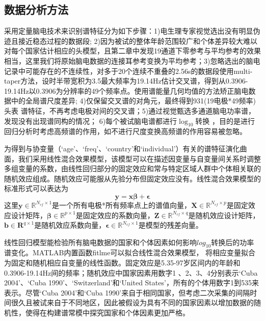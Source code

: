 \subsection{数据分析方法}\label{6ch:lme}
采用定量脑电技术来识别谱特征分为如下步骤：1)电生理专家视觉选出没有明显伪迹且接近稳态过程的数据段; 2)因为被试的整体年龄范围较广和个体差异较大难以对每个国家估计相应的头模型，且第二章中发现19通道下零参考与平均参考的效果相当，这里我们将原始脑电数据的连接耳参考变换为平均参考；3)忽略选出的脑电记录中可能存在的不连续性，对多于20个连续不重叠的2.56s的数据段使用multi-taper方法，设时半带宽积为3.5最大频率为19.14Hz估计交叉谱，得到从0.3906-19.14Hz以0.3906为分辨率的49个频率点。使用谱能量几何均值的方法矫正脑电数据中的全局谱尺度差异; 4)仅保留交叉谱的对角元，最终得到931(19电极*49频率)头表
谱特征，不再考虑电极对间的交叉谱；5)通过视觉甄选多通道脑电功率谱，发现没有出现谱同构的情况； 6)每个被试脑电谱都进行$\log_{10}$转换
，目的是进行回归分析时考虑高频谱的作用，如不进行尺度变换高频谱的作用容易被忽略。

为得到与协变量（‘age’、‘freq’、‘country’和‘individual’）有关的谱特征演化曲面，我们采用线性混合效果模型，该模型可以在描述因变量与自变量间关系时调整多组变量的系数，由线性回归部分的固定效应和常与特定区域人群中个体相关联的随机效应组成。随机效应可能服从先验分布但固定效应没有。线性混合效果模型的标准形式可以表达为
\begin{equation*}
\mathbf{y=x\beta+\epsilon}
\end{equation*}
这里$\mathbf{y}\in{\mathbb{R}^{N_{cf}\times{1}}}$是一个所有电极*所有频率点上的谱值向量，$\mathbf{X}\in{\mathbb{R}^{N_{cf}\times{p}}}$是固定效应设计矩阵，$\mathbf{\beta}\in{\mathbb{R}^{p\times{1}}}$是固定效应的系数向量，$\mathbf{Z}\in{\mathbb{R}^{N_{cf}\times{q}}}$是随机效应设计矩阵，$\mathbf{b}\in{\mathbf{R}^{q\times{1}}}$是随机效应系数向量，$\mathbf{\epsilon}\in{\mathbb{R}^{N_{cf}\times{1}}}$是模型的残差向量。

线性回归模型能检验所有脑电数据的国家和个体因素如何影响$log_{10}$转换后的功率谱变化。MATLAB内置函数fitlme可以拟合线性混合效果模型，
将相应变量拟合为固定和随机相应自变量的线性函数。固定效应是5.35-97岁区间内的年龄和0.3906-19.14Hz间的频率；随机效应中国家因素用数字1
、2、3、4分别表示‘Cuba 2004’、‘Cuba 1990’、‘Switzerland’和‘United States’，所有的个体用数字1到535来表示。尽管‘Cuba 2004’和‘Cuba 1990’来自于相同国家，但考虑二次采集的间隔时间很久且被试来自于不同地区，因此被假设为具有不同的国家因素以增加数据的随机性，使得在构建谱常模中探究国家和个体因素更加严格。

